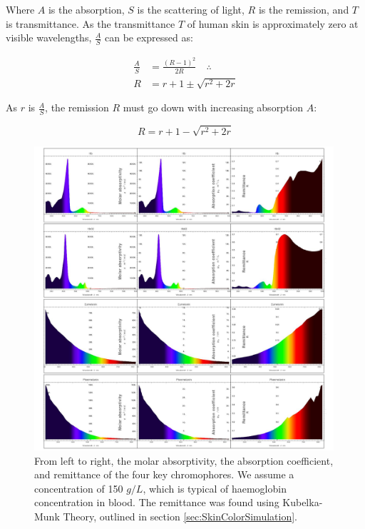Where $A$ is the absorption, $S$ is the scattering of light, $R$ is the remission, and $T$ is transmittance. As the transmittance $T$ of human skin is approximately zero at visible wavelengths, $\frac{A}{S}$ can be expressed as:

\begin{align}\label{eq:KubelkaMunk2}
\frac{A}{S} &=\frac{(R-1)^2}{2 R} \quad \therefore\\
R &= r+1 \pm \sqrt{r^2+2 r}
\end{align}

As $r$ is $\frac{A}{S}$, the remission $R$ must go down with increasing absorption $A$:

\begin{equation}\label{eq:KubelkaMunk3}
R = r+1 - \sqrt{r^2+2 r}
\end{equation}

\begin{figure}[h!]
  \centering
    \includegraphics[width=0.99\textwidth]{Chapter1/Figs/ChemicalSpectralProperties.jpg}
    \caption{From left to right, the molar absorptivity, the absorption coefficient, and remittance of the four key chromophores. We assume a concentration of 150 $g/L$, which is typical of haemoglobin concentration in blood. The remittance was found using Kubelka-Munk Theory, outlined in section \ref{sec:SkinColorSimulation}. }  \label{fig:ChemicalSpectralProperties}
\end{figure}

